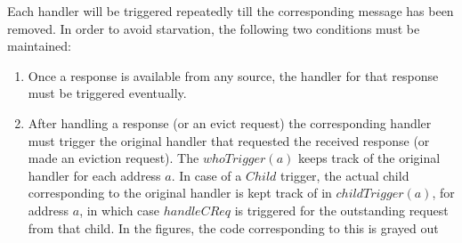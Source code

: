 
Each handler will be triggered repeatedly till the corresponding message has
been removed. In order to avoid starvation, the following two conditions must be
maintained:
\begin{enumerate}
\item Once a response is available from any source, the handler for that
response must be triggered eventually.
\item After handling a response (or an evict request) the corresponding handler
must trigger the original handler that requested the received response (or made
an eviction request). The $whoTrigger(a)$ keeps track of the original handler
for each address $a$. In case of a $Child$ trigger, the actual child
corresponding to the original handler is kept track of in $childTrigger(a)$, for
address $a$, in which case $handleCReq$ is triggered for the outstanding request
from that child. In the figures, the code corresponding to this is grayed out
\end{enumerate}


